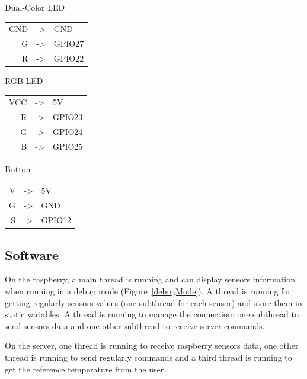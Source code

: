 \documentclass[10pt]{article}
\begin{document}
Dual-Color LED

\begin{table}[H]
  \centering
\begin{tabular}{rcl}
  GND &->& GND \\
  G &->& GPIO27 \\
  R &->& GPIO22 \\
\end{tabular}
\end{table}

RGB LED

\begin{table}[H]
  \centering
\begin{tabular}{rcl}
  VCC &->& 5V \\
  R &->& GPIO23 \\
  G &->& GPIO24 \\
  B &->& GPIO25 \\
\end{tabular}
\end{table}

Button

\begin{table}[H]
  \centering
\begin{tabular}{rcl}
  V &->& 5V \\
  G &->& GND \\
  S &->& GPIO12 \\
\end{tabular}
\end{table}

\subsection{Software}

On the raspberry, a main thread is running and can display sensors information when running in a debug mode (Figure~\ref{debugMode}).
A thread is running for getting regularly sensors values (one subthread for each sensor) and store them in static variables.
A thread is running to manage the connection: one subthread to send sensors data and one other subthread to receive server commands.

On the server, one thread is running to receive raspberry sensors data, one other thread is running to send regularly commands and a third thread is running to get the reference temperature from the user.
\end{document}
